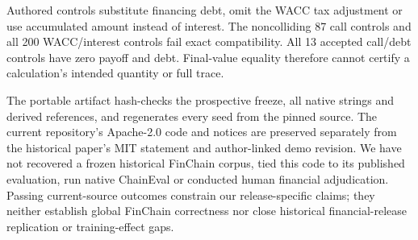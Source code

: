 Authored controls substitute financing debt, omit the WACC tax adjustment or use accumulated amount instead of interest. The noncolliding 87 call controls and all 200 WACC/interest controls fail exact compatibility. All 13 accepted call/debt controls have zero payoff and debt. Final-value equality therefore cannot certify a calculation's intended quantity or full trace.

The portable artifact hash-checks the prospective freeze, all native strings and derived references, and regenerates every seed from the pinned source. The current repository's Apache-2.0 code and notices are preserved separately from the historical paper's MIT statement and author-linked demo revision. We have not recovered a frozen historical FinChain corpus, tied this code to its published evaluation, run native ChainEval or conducted human financial adjudication. Passing current-source outcomes constrain our release-specific claims; they neither establish global FinChain correctness nor close historical financial-release replication or training-effect gaps.


